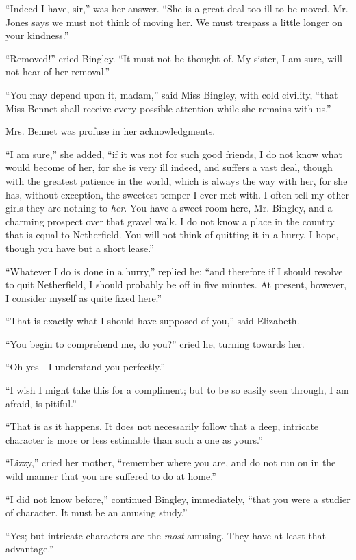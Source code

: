 ``Indeed I have, sir,'' was her answer. ``She is a great deal too ill to be moved. Mr. Jones says we must not think of moving her. We must trespass a little longer on your kindness.''

``Removed!'' cried Bingley. ``It must not be thought of. My sister, I am sure, will not hear of her removal.''

``You may depend upon it, madam,'' said Miss Bingley, with cold civility, ``that Miss Bennet shall receive every possible attention while she remains with us.''

Mrs. Bennet was profuse in her acknowledgments.

``I am sure,'' she added, ``if it was not for such good friends, I do not know what would become of her, for she is very ill indeed, and suffers a vast deal, though with the greatest patience in the world, which is always the way with her, for she has, without exception, the sweetest temper I ever met with. I often tell my other girls they are nothing to \textit{her}. You have a sweet room here, Mr. Bingley, and a charming prospect over that gravel walk. I do not know a place in the country that is equal to Netherfield. You will not think of quitting it in a hurry, I hope, though you have but a short lease.''

``Whatever I do is done in a hurry,'' replied he; ``and therefore if I should resolve to quit Netherfield, I should probably be off in five minutes. At present, however, I consider myself as quite fixed here.''

``That is exactly what I should have supposed of you,'' said Elizabeth.

``You begin to comprehend me, do you?'' cried he, turning towards her.

``Oh yes---I understand you perfectly.''

``I wish I might take this for a compliment; but to be so easily seen through, I am afraid, is pitiful.''

``That is as it happens. It does not necessarily follow that a deep, intricate character is more or less estimable than such a one as yours.''

``Lizzy,'' cried her mother, ``remember where you are, and do not run on in the wild manner that you are suffered to do at home.''

``I did not know before,'' continued Bingley, immediately, ``that you were a studier of character. It must be an amusing study.''

``Yes; but intricate characters are the \textit{most} amusing. They have at least that advantage.''

